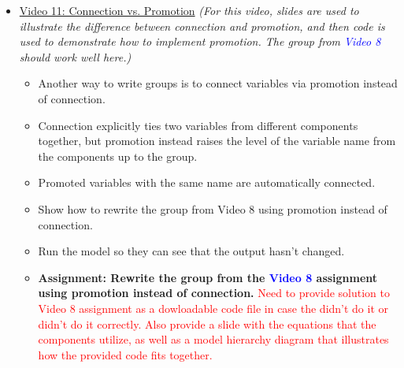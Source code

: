 \documentclass[12pt, letterpaper]{article}
\begin{document}
\begin{itemize}
	\item \underline{Video 11: Connection vs. Promotion} \textit{(For this video, slides are used to illustrate the difference between connection and promotion, and then code is used to demonstrate how to implement promotion. The group from \textcolor{blue}{Video 8} should work well here.)}
		\begin{itemize}
			\item Another way to write groups is to connect variables via promotion instead of connection.
			\item Connection explicitly ties two variables from different components together, but promotion instead raises the level of the variable name from the components up to the group.
			\item Promoted variables with the same name are automatically connected.
			\item Show how to rewrite the group from Video 8 using promotion instead of connection.
			\item Run the model so they can see that the output hasn't changed.
			\item \textbf{Assignment: Rewrite the group from the \textcolor{blue}{Video 8} assignment using promotion instead of connection.} \textcolor{red}{Need to provide solution to Video 8 assignment as a dowloadable code file in case the didn't do it or didn't do it correctly. Also provide a slide with the equations that the components utilize, as well as a model hierarchy diagram that illustrates how the provided code fits together.}
		\end{itemize}
		

\end{itemize}
\end{document}
